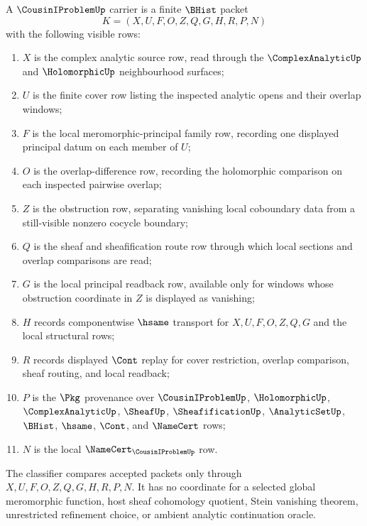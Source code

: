 \begin{definition}
\label{def:cousin-i-problem-carrier}
A $\CousinIProblemUp$ carrier is a finite $\BHist$ packet
$$
K=(X,U,F,O,Z,Q,G,H,R,P,N)
$$
with the following visible rows:
\begin{enumerate}
\item $X$ is the complex analytic source row, read through the $\ComplexAnalyticUp$ and $\HolomorphicUp$ neighbourhood surfaces;
\item $U$ is the finite cover row listing the inspected analytic opens and their overlap windows;
\item $F$ is the local meromorphic-principal family row, recording one displayed principal datum on each member of $U$;
\item $O$ is the overlap-difference row, recording the holomorphic comparison on each inspected pairwise overlap;
\item $Z$ is the obstruction row, separating vanishing local coboundary data from a still-visible nonzero cocycle boundary;
\item $Q$ is the sheaf and sheafification route row through which local sections and overlap comparisons are read;
\item $G$ is the local principal readback row, available only for windows whose obstruction coordinate in $Z$ is displayed as vanishing;
\item $H$ records componentwise $\hsame$ transport for $X,U,F,O,Z,Q,G$ and the local structural rows;
\item $R$ records displayed $\Cont$ replay for cover restriction, overlap comparison, sheaf routing, and local readback;
\item $P$ is the $\Pkg$ provenance over $\CousinIProblemUp$, $\HolomorphicUp$, $\ComplexAnalyticUp$, $\SheafUp$, $\SheafificationUp$, $\AnalyticSetUp$, $\BHist$, $\hsame$, $\Cont$, and $\NameCert$ rows;
\item $N$ is the local $\NameCert_{\CousinIProblemUp}$ row.
\end{enumerate}
The classifier compares accepted packets only through $X,U,F,O,Z,Q,G,H,R,P,N$. It has no coordinate for a selected global meromorphic function, host sheaf cohomology quotient, Stein vanishing theorem, unrestricted refinement choice, or ambient analytic continuation oracle.
\end{definition}


